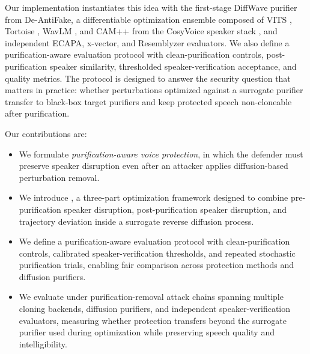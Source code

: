 Our implementation instantiates this idea with the first-stage DiffWave purifier from De-AntiFake, 
a differentiable optimization ensemble composed of VITS \cite{kim2021vits}, Tortoise \cite{betker2023tortoise}, WavLM \cite{chen2022wavlm}, and CAM++ from the CosyVoice speaker stack \cite{du2024cosyvoice}, 
and independent ECAPA, x-vector, and Resemblyzer evaluators. 
We also define a purification-aware evaluation protocol with clean-purification controls, 
post-purification speaker similarity, thresholded speaker-verification acceptance, and quality metrics. 
The protocol is designed to answer the security question that matters in practice: whether perturbations optimized against a surrogate purifier transfer to black-box target purifiers and keep protected speech non-cloneable after purification.

Our contributions are:
\begin{itemize}
    \item We formulate \emph{purification-aware voice protection}, in which the defender must preserve speaker disruption even after an attacker applies diffusion-based perturbation removal.
    \item We introduce \method, a three-part optimization framework designed to combine pre-purification speaker disruption, post-purification speaker disruption, and trajectory deviation inside a surrogate reverse diffusion process.
    \item We define a purification-aware evaluation protocol with clean-purification controls, calibrated speaker-verification thresholds, and repeated stochastic purification trials, 
    enabling fair comparison across protection methods and diffusion purifiers.
    \item We evaluate \method{} under purification-removal attack chains spanning multiple cloning backends, diffusion purifiers, and independent speaker-verification evaluators,
    measuring whether protection transfers beyond the surrogate purifier used during optimization while preserving speech quality and intelligibility.
\end{itemize}
